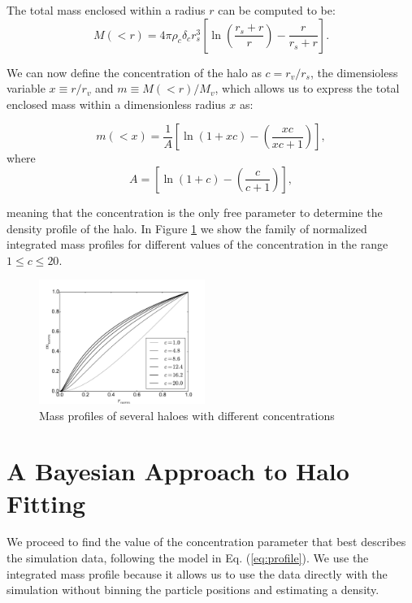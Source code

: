 \documentclass[useAMS,usenatbib]{mn2e}
\begin{document}
The total mass enclosed within a radius $r$ can be computed to be:
\begin{equation}
M(<r) = 4\pi\rho_c\delta_c  r_s^3\left[\ln \left
  (\frac{r_s+r}{r}\right) - \frac{r}{r_s+r}\right].
\end{equation}
 
We can now define the concentration of the halo as $c=r_v/r_s$, the
dimensioless variable $x\equiv r/r_v$ and $m\equiv M(<r)/M_v$, which
allows us to express the total enclosed mass within a dimensionless
radius $x$ as:


\begin{equation}
m(<x) =
\frac{1}{A}\left[\ln\left(1+xc\right)-\left(\frac{xc}{xc+1}\right)\right],
\label{eq:profile}
\end{equation}
%
where 
%
\begin{equation}
A=\left[\ln\left(1+c\right)-\left(\frac{c}{c+1}\right)\right],
\end{equation}

meaning that the concentration is the only free parameter to
determine the density profile of the halo. In Figure
\ref{fig:profiles} we show the family of normalized integrated mass
profiles for different values of the concentration in the range
$1\leq c \leq 20$. 

\begin{figure}
\begin{center}
  \includegraphics[width=0.48\textwidth]{nfw_normalized.pdf}
\end{center}
\caption{Mass profiles of several haloes with different concentrations
    \label{fig:profiles}}
\end{figure}


\section{A Bayesian Approach to Halo Fitting}
\label{sec:method}


We proceed to find the value of the concentration parameter that
best describes the simulation data, following the model in
Eq. (\ref{eq:profile}). We use the integrated mass profile because it
allows us to use the data directly with the simulation without binning
the particle positions and estimating a density.
\end{document}
